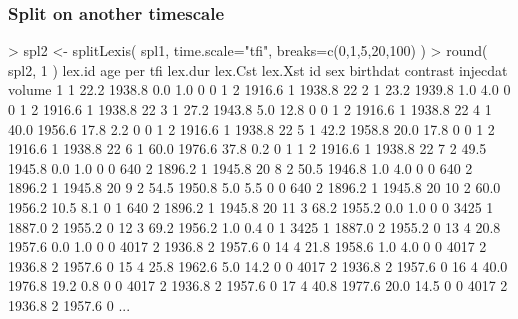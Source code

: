 \begin{frame}[fragile]
  \frametitle{Split on another timescale}
\vspace*{-1em}
\footnotesize
\renewcommand{\baselinestretch}{0.9}
\begin{semiverbatim}
> spl2 <- splitLexis( spl1, time.scale="tfi",
                            breaks=c(0,1,5,20,100) )
> round( spl2, 1 )
   lex.id  age    per  tfi lex.dur lex.Cst lex.Xst   id sex birthdat contrast injecdat volume
\alert<2>{1       1 22.2 1938.8  0.0     1.0       0       0    1   2   1916.6        1   1938.8     22}
\alert<2,4>{2       1 23.2 1939.8  1.0     4.0       0       0    1   2   1916.6        1   1938.8     22}
\alert<2,4>{3       1 27.2 1943.8  5.0    12.8       0       0    1   2   1916.6        1   1938.8     22}
\alert<2,3>{4       1 40.0 1956.6 17.8     2.2       0       0    1   2   1916.6        1   1938.8     22}
\alert<2,4>{5       1 42.2 1958.8 20.0    17.8       0       0    1   2   1916.6        1   1938.8     22}
\alert<2,3>{6       1 60.0 1976.6 37.8     0.2       0       1    1   2   1916.6        1   1938.8     22}
\alert<5>{7       2 49.5 1945.8  0.0     1.0       0       0  640   2   1896.2        1   1945.8     20}
\alert<5>{8       2 50.5 1946.8  1.0     4.0       0       0  640   2   1896.2        1   1945.8     20}
\alert<5>{9       2 54.5 1950.8  5.0     5.5       0       0  640   2   1896.2        1   1945.8     20}
\alert<5>{10      2 60.0 1956.2 10.5     8.1       0       1  640   2   1896.2        1   1945.8     20}
\alert<6>{11      3 68.2 1955.2  0.0     1.0       0       0 3425   1   1887.0        2   1955.2      0}
\alert<6>{12      3 69.2 1956.2  1.0     0.4       0       1 3425   1   1887.0        2   1955.2      0}
\alert<7>{13      4 20.8 1957.6  0.0     1.0       0       0 4017   2   1936.8        2   1957.6      0}
\alert<7>{14      4 21.8 1958.6  1.0     4.0       0       0 4017   2   1936.8        2   1957.6      0}
\alert<7>{15      4 25.8 1962.6  5.0    14.2       0       0 4017   2   1936.8        2   1957.6      0}
\alert<7>{16      4 40.0 1976.8 19.2     0.8       0       0 4017   2   1936.8        2   1957.6      0}
\alert<7>{17      4 40.8 1977.6 20.0    14.5       0       0 4017   2   1936.8        2   1957.6      0}
...
\end{semiverbatim}
\end{frame}

